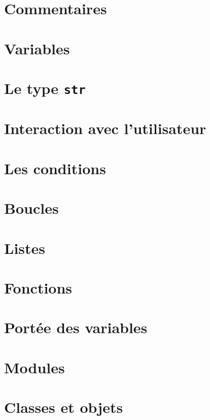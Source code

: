 \documentclass[12pt,a4paper,oneside]{report}
\begin{document}
\section{Commentaires}


\section{Variables}
\label{variables}


\section{Le type \texttt{str}}


\section{Interaction avec l'utilisateur}


\section{Les conditions}


\section{Boucles}


\section{Listes}


\section{Fonctions}


\section{Portée des variables}


\section{Modules}


\section{Classes et objets}

\end{document}
